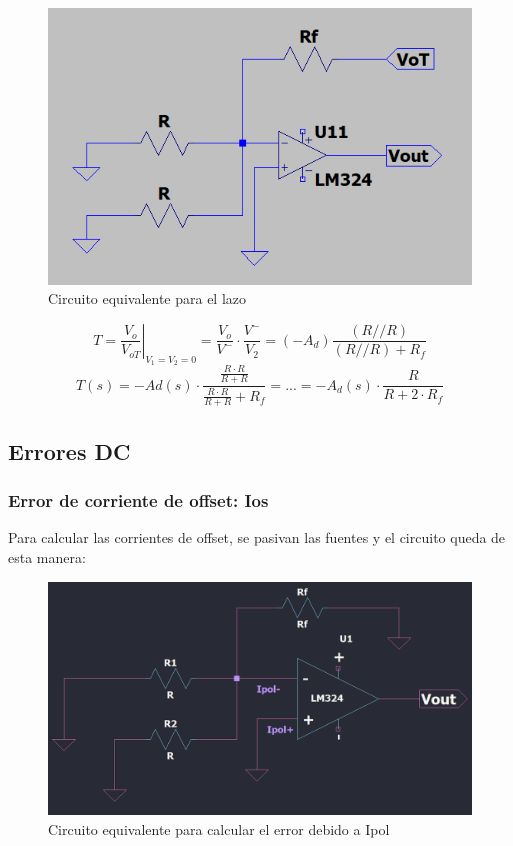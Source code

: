 \begin{figure}[h!]
    \centering
    \includegraphics[width=0.90\linewidth]{img/equivalente_lazo.png}
    \caption{Circuito equivalente para el lazo}
    \label{fig:esquematico}
\end{figure}


\[T = \left.\frac{V_{o}}{V_{oT}}\right|_{V_{1}=V_{2}=0} = \frac{V_{o}}{V^{-}} \cdot \frac{V^{-}}{V_{2}} = (-A_d) \frac{(R // R)}{(R // R)+R_f} \]
\[
 T (s) = -Ad(s) \cdot \frac{\frac{R \cdot R}{R+R}}{\frac{R \cdot R}{R+R} + R_f} = ... 
 = -A_d (s) \cdot  \frac{R}{R + 2\cdot R_f}\] 

\subsection{Errores DC}

\subsubsection{Error de corriente de offset: Ios}
Para calcular las corrientes de offset, se pasivan las fuentes y el circuito queda de esta manera:

\begin{figure}[h!]
    \centering
    \includegraphics[width=0.90\linewidth]{img/equivalente_ios.png}
    \caption{Circuito equivalente para calcular el error debido a Ipol}
    \label{fig:equivalente_ios}
\end{figure}

